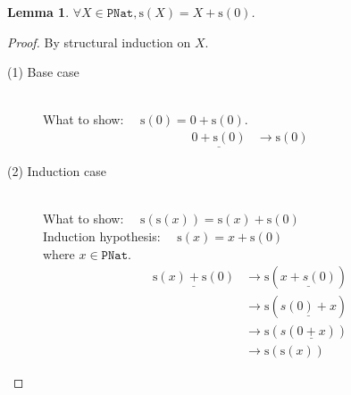 \documentclass[12pt, a4paper]{article}
\newtheorem{lemma}[theorem]{Lemma}
\newcommand{\rel}[1]{\mathrel{#1}}
\newcommand{\rmx}[1]{\mathrm{#1}}
\newcommand{\larrow}{\longrightarrow}
\newcommand{\under}{\underline}
\begin{document}
\begin{lemma}
\label{lm2}
$\forall X \in \mathtt{PNat}, \rmx{s}(X) = X \rel{+} \rmx{s}(0)$.
\end{lemma}
\begin{proof}
By structural induction on $X$.

\begin{description}

\item[(1) Base case]~\\
\noindent
What to show: $\quad \rmx{s}(0) = 0 \rel{+} \rmx{s}(0)$.
\begin{align*}
\under{0 \rel{+} \rmx{s}(0)}
	&\larrow \rmx{s}(0) \tag{by +1}
\end{align*}

\item[(2) Induction case]~\\
What to show: $\quad \rmx{s}(\rmx{s}(x)) = \rmx{s}(x) \rel{+} \rmx{s}(0)$ \\
Induction hypothesis: $\quad \rmx{s}(x) = x \rel{+} \rmx{s}(0)$  \\
where $x \in \mathtt{PNat}$.
\begin{align*}
\under{\rmx{s}(x) \rel{+} \rmx{s}(0)}
	&\larrow \rmx{s}(\under{x + s(0)}) \tag{by +2} \\
	&\larrow \rmx{s}(\under{s(0) + x}) \tag{by comm+} \\
	&\larrow \rmx{s}(s(\under{0 + x})) \tag{by +2} \\
	&\larrow \rmx{s}(\rmx{s}(x)) \tag{by +1}
\end{align*}

\end{description}
\end{proof}
\end{document}
